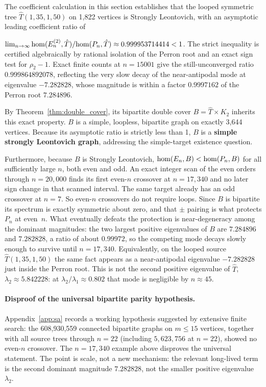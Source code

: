 The coefficient calculation in this section establishes that the looped symmetric
tree $\hat{T}(1, 35, 1, 50)$ on 1,822 vertices is Strongly Leontovich, with an asymptotic leading
coefficient ratio of

$\lim_{n \to \infty} \mathrm{hom}(E_n^{(2)}, \hat{T}) / \mathrm{hom}(P_n, \hat{T})
\approx 0.999953714414 < 1$.
The strict inequality is certified algebraically by rational isolation of the
Perron root and an exact sign test for $\rho_2-1$.
Exact finite counts at $n=15001$ give the
still-unconverged ratio $0.999864892078$, reflecting the very slow decay of the
near-antipodal mode at eigenvalue $-7.282828$, whose magnitude is within a
factor $0.9997162$ of the Perron root $7.284896$.

By Theorem~\ref{thm:double_cover}, its bipartite double cover $B = \hat{T}
\times K_2$ inherits this exact property. $B$ is a simple, loopless, bipartite
graph on exactly 3,644 vertices. Because its asymptotic ratio is strictly less
than 1, $B$ is a \textbf{simple strongly Leontovich graph}, addressing the
simple-target existence question.

Furthermore, because $B$ is Strongly Leontovich, $\mathrm{hom}(E_n, B) < \mathrm{hom}(P_n, B)$
for all sufficiently large $n$, both even and odd. An exact integer scan of the
even orders through $n=20{,}000$ finds its first even-$n$ crossover at
$n=17{,}340$ and no later sign change in that scanned interval. The same target
already has an odd crossover at $n=7$.
So even-$n$ crossovers do not require loops. Since $B$ is bipartite its
spectrum is exactly symmetric about zero, and that $\pm$ pairing is what
protects $P_n$ at even~$n$. What eventually defeats the protection is
near-degeneracy among the dominant magnitudes: the two largest positive
eigenvalues of $B$ are $7.284896$ and $7.282828$, a ratio of about
$0.99972$, so the competing mode decays slowly enough to survive until
$n = 17{,}340$. Equivalently, on the looped source $\hat{T}(1,35,1,50)$
the same fact appears as a near-antipodal eigenvalue $-7.282828$ just
inside the Perron root. This is not the second positive eigenvalue of
$\hat{T}$, $\lambda_2 \approx 5.842228$: at
$\lambda_2/\lambda_1 \approx 0.802$ that mode is negligible by
$n \approx 45$.

\paragraph{Disproof of the universal bipartite parity hypothesis.}
Appendix~\ref{app:sa} records a working hypothesis suggested by
extensive finite search: the 608,930,559 connected bipartite graphs on
$m \le 15$ vertices, together with all source trees through $n=22$
(including $5{,}623{,}756$ at $n=22$), showed no even-$n$ crossover. The
$n=17{,}340$ example above disproves the universal statement. The point
is scale, not a new mechanism: the relevant long-lived term is the
second dominant magnitude $7.282828$, not the smaller positive
eigenvalue $\lambda_2$.

